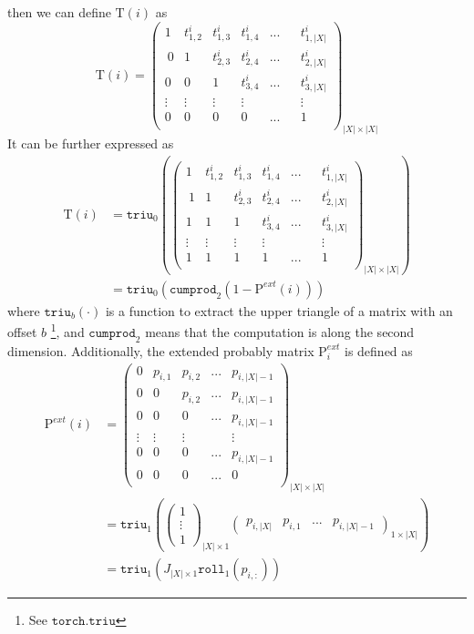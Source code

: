 then we can define $\mathrm{T}(i)$ as
\begin{equation}
    \mathrm{T}(i) = \begin{pmatrix}
1 & t^{i}_{1,2} & t^{i}_{1,3} & t^{i}_{1,4}  &... & & t^{i}_{1,|X|}\\\
0 & 1 & t^{i}_{2,3} & t^{i}_{2,4} &... & & t^{i}_{2,|X|}\\
0 & 0 & 1 & t^{i}_{3,4} &... & & t^{i}_{3,|X|}\\
\vdots & \vdots & \vdots & \vdots  & & & \vdots \\
0 & 0 & 0 & 0 &... & & 1\\
\end{pmatrix}_{|X| \times |X|}
\end{equation}
It can be further expressed as
\begin{align}
    \mathrm{T}(i) &=
     \texttt{triu}_0 \left(\begin{pmatrix}
1 & t^{i}_{1,2} & t^{i}_{1,3} & t^{i}_{1,4}  &... & & t^{i}_{1,|X|}\\\
1 & 1 & t^{i}_{2,3} & t^{i}_{2,4} &... & & t^{i}_{2,|X|}\\
1 & 1 & 1 & t^{i}_{3,4} &... & & t^{i}_{3,|X|}\\
\vdots & \vdots & \vdots & \vdots  & & & \vdots \\
1 & 1 & 1 & 1 &... & & 1\\
\end{pmatrix}_{|X| \times |X|} \right)\\
&= \texttt{triu}_0\left(\texttt{cumprod}_2(1 - \mathrm{P}^{ext}(i))\right)
\end{align}
where $\texttt{triu}_b\left(\cdot\right)$
is a function to extract the upper triangle of a matrix with an offset $b$ \footnote{See $\texttt{torch.triu}$},
and $\texttt{cumprod}_2$ means that the computation is along the second dimension.
Additionally, the extended probably matrix $\mathrm{P}_i^{ext}$ is defined as
\begin{align}
    \mathrm{P}^{ext}(i)  &= \begin{pmatrix}
0 & p_{i,1} & p_{i,2}& ... & p_{i,|X| - 1}\\
0 & 0 & p_{i,2}& ... & p_{i,|X| - 1}\\
0 & 0 & 0& ... & p_{i,|X| - 1}\\
\vdots & \vdots & \vdots & & \vdots\\
0 & 0& 0& ... & p_{i,|X| - 1}\\
0 & 0& 0& ... & 0\\
\end{pmatrix}_{|X| \times |X|}\\
    &= \texttt{triu}_1 \left( \begin{pmatrix} 1 \\ \vdots \\ 1 \end{pmatrix}_{|X| \times 1}  \begin{pmatrix} p_{i,|X|} &p_{i,1} & ... & p_{i,|X| - 1} \end{pmatrix}_{1 \times |X|}\right)\\
    &= \texttt{triu}_1\left( J_{|X| \times 1} \texttt{roll}_1(p_{i,:})\right)
\end{align}
